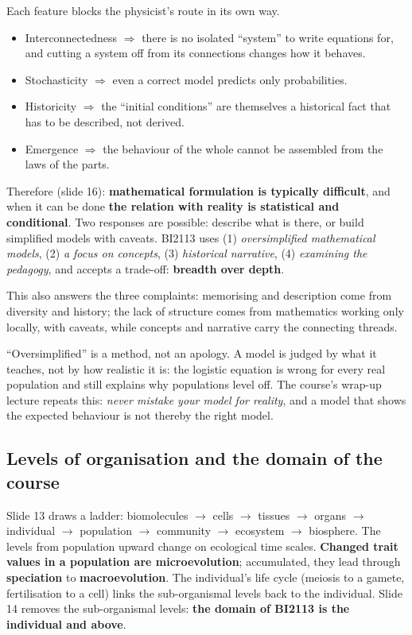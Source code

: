 \begin{chain}
Each feature blocks the physicist's route in its own way.
\begin{itemize}
\item Interconnectedness $\Rightarrow$ there is no isolated ``system'' to write equations for, and cutting a
system off from its connections changes how it behaves.
\item Stochasticity $\Rightarrow$ even a correct model predicts only probabilities.
\item Historicity $\Rightarrow$ the ``initial conditions'' are themselves a historical fact that has to be described,
not derived.
\item Emergence $\Rightarrow$ the behaviour of the whole cannot be assembled from the laws of the parts.
\end{itemize}
Therefore (slide 16): \textbf{mathematical formulation is typically difficult}, and when it can be done
\textbf{the relation with reality is statistical and conditional}. Two responses are possible: describe what is
there, or build simplified models with caveats. BI2113 uses (1) \emph{oversimplified mathematical models},
(2) \emph{a focus on concepts}, (3) \emph{historical narrative}, (4) \emph{examining the pedagogy}, and
accepts a trade-off: \textbf{breadth over depth}.

This also answers the three complaints: memorising and description come from diversity and history; the lack of
structure comes from mathematics working only locally, with caveats, while concepts and narrative carry the
connecting threads.
\end{chain}

\begin{keyidea}
``Oversimplified'' is a method, not an apology. A model is judged by what it teaches, not by how realistic it is:
the logistic equation is wrong for every real population and still explains why populations level off. The
course's wrap-up lecture repeats this: \emph{never mistake your model for reality}, and a model that shows the
expected behaviour is not thereby the right model.
\end{keyidea}

\subsection{Levels of organisation and the domain of the course}
Slide 13 draws a ladder: biomolecules $\to$ cells $\to$ tissues $\to$ organs $\to$ individual $\to$
population $\to$ community $\to$ ecosystem $\to$ biosphere. The levels from population upward change on
ecological time scales. \textbf{Changed trait values in a population are microevolution}; accumulated, they lead
through \textbf{speciation} to \textbf{macroevolution}. The individual's life cycle (meiosis to a gamete,
fertilisation to a cell) links the sub-organismal levels back to the individual. Slide 14 removes the
sub-organismal levels: \textbf{the domain of BI2113 is the individual and above}.

